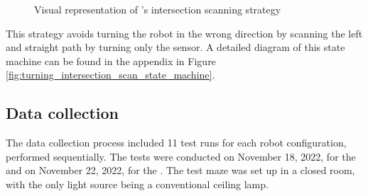 \begin{figure}
    \centering
    \hfill
    \caption{Visual representation of \TurnRob's intersection scanning strategy}
    \label{fig:intersection_scan}
\end{figure}

This strategy avoids turning the robot in the wrong direction by scanning the left and straight path by turning only the sensor. A detailed diagram of this state machine can be found in the appendix in Figure \ref{fig:turning_intersection_scan_state_machine}. 

\subsection{Data collection} \label{sec:data_collection}

The data collection process included 11 test runs for each robot configuration, performed sequentially. The tests were conducted on November 18, 2022, for the \fixedSensorRobot and on November 22, 2022, for the \turningSensorRobot. The test maze was set up in a closed room, with the only light source being a conventional ceiling lamp.


